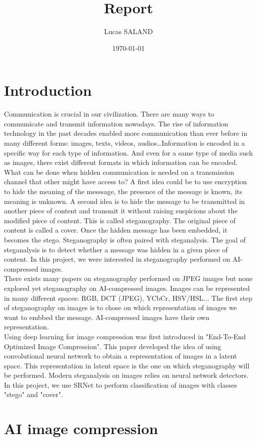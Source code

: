 \documentclass[12pt]{article}
\title{Report}
\author{Lucas SALAND}
\date{\today}
\begin{document}

\tableofcontents
{}
\section{Introduction}
Communication is crucial in our civilization. There are many ways to communicate and transmit information nowadays. The rise of information technology in the past decades enabled more communication than ever before in many different forms: images, texts, videos, audios\dots Information is encoded in a specific way for each type of information. And even for a same type of media such as images, there exist different formats in which information can be encoded. What can be done when hidden communication is needed on a transmission channel that other might have access to? A first idea could be to use encryption to hide the meaning of the messsage, the presence of the message is known, its meaning is unknown.  A second idea is to hide the message to be transmitted in another piece of content and transmit it without raising suspicions about the modified piece of content. This is called steganography. The original piece of content is called a cover. Once the hidden message has been embedded, it becomes the stego. Steganography is often paired with steganalysis. The goal of steganalysis is to detect whether a message was hidden in a given piece of content. In this project, we were interested in steganography performed on AI-compressed images.\\
There exists many papers on steganography performed on JPEG images but none explored yet steganography on AI-compressed images. Images can be represented in many different spaces: RGB, DCT (JPEG), YCbCr, HSV/HSL... The first step of steganography on images is to chose on which representation of images we want to embbed the message. AI-compressed images have their own representation.\\
Using deep learning for image compression was first introduced in "End-To-End Optimized Image Compression". This paper developed the idea of using convolutional neural network to obtain a representation of images in a latent space. This representation in latent space is the one on which steganography will be performed. Modern steganalysis on images relies on neural network detectors. In this project, we use SRNet to perform classification of images with classes "stego" and "cover".

\section{AI image compression}
\end{document}
